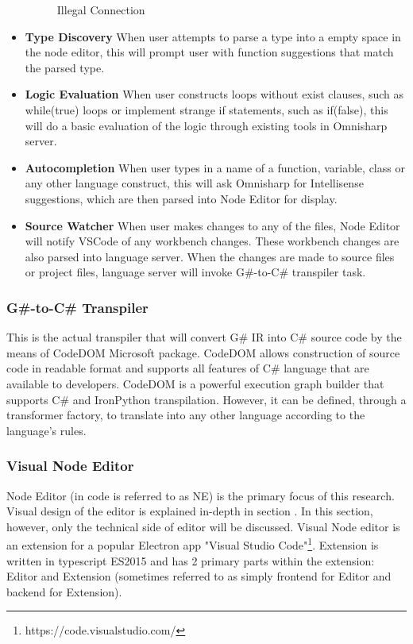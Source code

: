 \documentclass{article}
\begin{document}
\begin{itemize}
\begin{figure}[H]
        \caption{Illegal Connection}
        \label{fig:badconerror}
    \end{figure}
    \item \textbf{Type Discovery} \newline
    When user attempts to parse a type into a empty space in the node editor, this will prompt user with function suggestions that match the parsed type.
    \item \textbf{Logic Evaluation} \newline
    When user constructs loops without exist clauses, such as while(true) loops or implement strange if statements, such as if(false), this will do a basic evaluation of the logic through existing tools in Omnisharp server.
    \item \textbf{Autocompletion} \newline
    When user types in a name of a function, variable, class or any other language construct, this will ask Omnisharp for Intellisense suggestions, which are then parsed into Node Editor for display.
    \item \textbf{Source Watcher} \newline
    When user makes changes to any of the files, Node Editor will notify VSCode of any workbench changes. These workbench changes are also parsed into language server. When the changes are made to source files or project files, language server will invoke G\#-to-C\# transpiler task.
\end{itemize}
\subsubsection{G\#-to-C\# Transpiler}
This is the actual transpiler that will convert G\# IR into C\# source code by the means of CodeDOM Microsoft package. CodeDOM allows construction of source code in readable format and supports all features of C\# language that are available to developers. CodeDOM is a powerful execution graph builder that supports C\# and IronPython transpilation. However, it can be defined, through a transformer factory, to translate into any other language according to the language's rules.
\subsubsection{Visual Node Editor}
Node Editor (in code is referred to as NE) is the primary focus of this research. Visual design of the editor is explained in-depth in section . In this section, however, only the technical side of editor will be discussed.
Visual Node editor is an extension for a popular Electron app "Visual Studio Code"\footnote{https://code.visualstudio.com/}. Extension is written in typescript ES2015 and has 2 primary parts within the extension: Editor and Extension (sometimes referred to as simply frontend for Editor and backend for Extension). 
\end{document}
